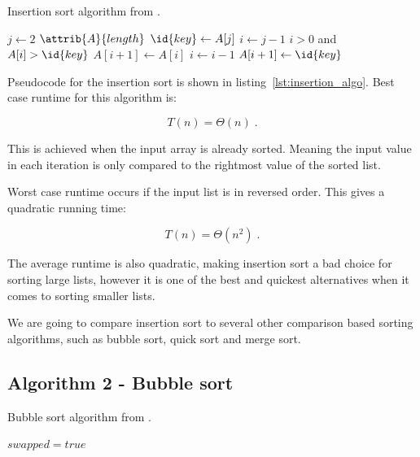 \documentclass[sigconf, nonacm, natbib, screen, balance=False]{acmart}
\begin{document}
\begin{listing}
  \caption{Insertion sort algorithm from \citet[Ch.~2.1]{CLRS_2009}.}
  \label{lst:insertion_algo}

  \begin{codebox}
    \li \For $j \gets 2$ \To $\attrib{A}{length}$
    \li \Do
    $\id{key} \gets A[j]$
    \li     $i \gets j-1$
    \li      \While $i>0$ and $A[i] > \id{key}$
    \li      \Do
    $A[i+1] \gets A[i]$
    \li         $i \gets i-1$
    \End    
    \li       $A[i+1]\gets \id{key}$
    \End
  \end{codebox}
\end{listing}

Pseudocode for the insertion sort is shown in
listing~\ref{lst:insertion_algo}. 
Best case runtime for this algorithm is:

\begin{equation}
  T(n) = \Theta(n) \;.  \label{eq:ins_sort_best}
\end{equation}

This is achieved when the input array is already sorted. Meaning the input value in each iteration is only compared to the rightmost value of the sorted list. 

Worst case runtime occurs if the input list is in reversed order. This gives a quadratic running time:

\begin{equation}
  T(n) = \Theta(n^2) \;.  \label{eq:ins_sort_best}
\end{equation}

The average runtime is also quadratic, making insertion sort a bad choice for sorting large lists, however it is one of the best and quickest alternatives when it comes to sorting smaller lists. 

We are going to compare insertion sort to several other comparison based sorting algorithms, such as bubble sort, quick sort and merge sort.

\subsection{Algorithm 2 - Bubble sort}\label{sec:algo2}

\begin{listing}
  \caption{Bubble sort algorithm from \citet[Ch.~2.1]{CLRS_2009}.}
  \label{lst:bubble_algo}
 
  \begin{codebox}
    \li $swapped = true$

  \end{codebox}
\end{listing}
\end{document}
